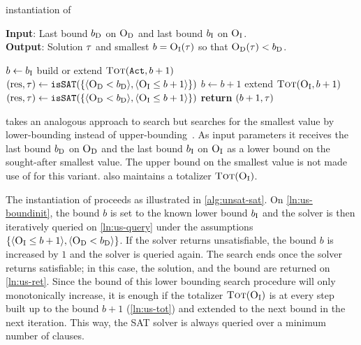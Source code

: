 \begin{algorithm}[t]
  \caption{\unsatsat{} instantiation of \Min{}}\label{alg:unsat-sat}
  \textbf{Input}: Last bound $b_{\text{D}}$ on $\textsc{O}_{\text{D}}$ and last bound $b_{\text{I}}$ on $\textsc{O}_{\text{I}}$. \\
  \textbf{Output}: Solution $\tau$ and smallest $b=\textsc{O}_{\text{I}}(\tau)$ so that $\textsc{O}_{\text{D}}(\tau)<b_{\text{D}}$.

  \begin{algorithmic}[1]
    \STATE $b \gets b_{\text{I}}$ \label{ln:us-boundinit}
    \STATE build or extend $\textsc{Tot}(\texttt{Act},b+1)$
    \STATE $(\text{res},\tau) \gets \texttt{isSAT}(\{\langle \textsc{O}_{\text{D}} < b_{\text{D}} \rangle, \langle \textsc{O}_{\text{I}} \leq b+1 \rangle\})$
    \WHILE{$\res = \unsat$}
      \STATE $b \gets b+1$
      \STATE extend $\textsc{Tot}(\textsc{O}_{\text{I}},b+1)$ \label{ln:us-tot}
      \STATE $(\text{res},\tau) \gets \texttt{isSAT}(\{\langle \textsc{O}_{\text{D}} < b_{\text{D}} \rangle, \langle \textsc{O}_{\text{I}} \leq b+1 \rangle\})$ \label{ln:us-query}
    \ENDWHILE
    \STATE \textbf{return} $(b+1,\tau)$ \label{ln:us-ret}
  \end{algorithmic}
\end{algorithm}

\unsatsat{} takes an analogous approach to \satunsat{} search but searches for the smallest value by lower-bounding instead of upper-bounding~\autocite{DBLP:conf/sat/FuM06}.
As input parameters it receives the last bound $b_{\text{D}}$ on $\textsc{O}_{\text{D}}$ and the last bound $b_{\text{I}}$ on $\textsc{O}_{\text{I}}$ as a lower bound on the sought-after smallest value.
The upper bound on the smallest value is not made use of for this variant.
\unsatsat{} also maintains a totalizer $\textsc{Tot}(\textsc{O}_{\text{I}})$.

The \unsatsat{} instantiation of \Min{} proceeds as illustrated in \cref{alg:unsat-sat}.
On \cref{ln:us-boundinit}, the bound $b$ is set to the known lower bound $b_{\text{I}}$ and the solver is then iteratively queried on \cref{ln:us-query} under the assumptions $\{ \langle \textsc{O}_{\text{I}} \leq b+1 \rangle, \langle \textsc{O}_{\text{D}} < b_{\text{D}} \rangle \}$.
If the solver returns unsatisfiable, the bound $b$ is increased by $1$ and the solver is queried again.
The search ends once the solver returns satisfiable;
in this case, the solution, and the bound are returned on \cref{ln:us-ret}.
Since the bound of this lower bounding search procedure will only monotonically increase, it is enough if the totalizer $\textsc{Tot}(\textsc{O}_{\text{I}})$ is at every step built up to the bound $b+1$ (\cref{ln:us-tot}) and extended to the next bound in the next iteration.
This way, the SAT solver is always queried over a minimum number of clauses.

